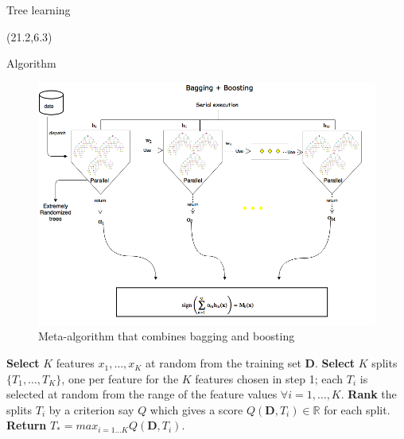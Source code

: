 \documentclass[final]{beamer}
\begin{document}
\begin{frame}{}
\begin{textblock}{20.0}
\begin{block}{Tree learning}
\end{block}

\end{textblock}


\begin{textblock}{20}(21.2,6.3)

\begin{block}{Algorithm}

\begin{figure}
\includegraphics[scale=0.65]{bagboost.png}
\caption{\tiny{Meta-algorithm that combines bagging and boosting}}
\end{figure}
\vspace{-8mm}
\begin{algorithmic}[1]
\STATE \textbf{Select} $K$ features ${x_{1}, \dots , x_{K}}$ at random from the training set $\mathbf{D}$.
\STATE \textbf{Select} $K$ splits $\{T_{1}, \dots , T_{K}\}$, one per feature for the $K$ features chosen in step 1; each $T_{i}$ is selected at random from the range of the feature values $\forall i = 1,\dots,K$.
\STATE \textbf{Rank} the splits $T_{i}$ by a criterion say $Q$ which gives a score $Q(\mathbf{D}, T_{i}) \in \mathbb{R}$ for each split. 
\STATE \textbf{Return} $T_{*} = max_{i=1 \dots K}Q(\mathbf{D}, T_{i})$.  
\end{algorithmic}
\end{block}


\end{textblock}
\end{frame}
\end{document}
